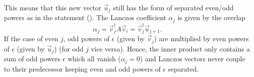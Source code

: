 This means that this new vector $\vec{u}_j$ still has the form of separated even/odd powers
as in the statement ().
The Lanczos coefficient $\alpha_j$ is given by the overlap
\begin{equation}
    \alpha_j
    =
    \vec{v}_j^\dagger A \vec{v}_i
    =
    \vec{v}_j^\dagger \vec{u}_{j+1}.
\end{equation}
If the case of even $j$, odd powers of $\epsilon$ (given by $\vec{v}_j$)
are multiplied by even powers of $\epsilon$ (given by $\vec{u}_j$)
(for odd $j$ vice versa).
Hence, the inner product only contains a sum of odd powers $\epsilon$ which all vanish
($\alpha_j = 0$)
and Lanczos vectors never couple to their predecessor
keeping even and odd powers of $\epsilon$ separated.
